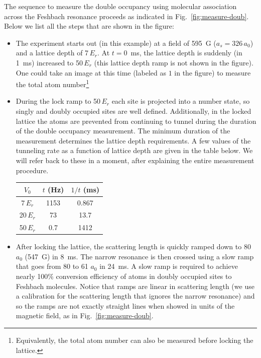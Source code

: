 The sequence to measure the double occupancy using molecular association across
the Feshbach resonance proceeds as indicated in Fig.~\ref{fig:measure-doub}.
Below we list all the steps that are shown in the figure: 
\begin{itemize}
\item  The experiment starts out (in this example) at a field of 595~G
($a_{s}=326\,a_{0}$) and a lattice depth of 7\,$E_{r}$.  At $t=0$~ms, the
lattice depth is suddenly (in 1~ms) increased to 50\,$E_{r}$ (this lattice
depth ramp is not shown in the figure).  One could take an image at this time
(labeled as $\boxed{1}$ in the figure) to measure the total atom
number\footnote{Equivalently, the total atom number can also be measured before
locking the lattice.}  

\item During the lock ramp to 50\,$E_{r}$ each site is projected into a number
state, so singly and doubly occupied sites are well defined.  Additionally, in
the locked lattice the atoms are prevented from continuing to tunnel during the
duration of the double occupancy measurement.  The minimum duration of the
measurement determines the lattice depth requirements.  A few values of the
tunneling rate as a function of lattice depth are given in the table below.  We
will refer back to these in a moment, after explaining the entire measurement
procedure.
 
\vspace{0.5em}
\begin{centering}
 \begin{tabular}{c|cc}
      $V_{0}$ & $t$ (Hz)  & $1/t$ (ms) \\ 
      \hline
    7\,$E_{r}$  & 1153  & 0.867 \\  
    20\,$E_{r}$  & 73  & 13.7 \\ 
    50\,$E_{r}$  & 0.7  & 1412  \\
\end{tabular}
\end{centering}
\vspace{1em} 

\item  After locking the lattice, the scattering length is quickly ramped down
to  80~$a_{0}$ (547~G) in 8~ms.   The narrow resonance is then crossed using a
slow ramp that goes from 80 to 61 $a_{0}$ in 24~ms.  A slow ramp is required to
achieve nearly 100\% conversion efficiency of atoms in doubly occupied sites to
Feshbach molecules.  Notice that  ramps are linear in scattering length (we use
a calibration for the scattering length that ignores the narrow resonance) and
so the ramps are not exactly straight lines when showed in units of the
magnetic field, as in Fig.~\ref{fig:measure-doub}.  


\end{itemize}
